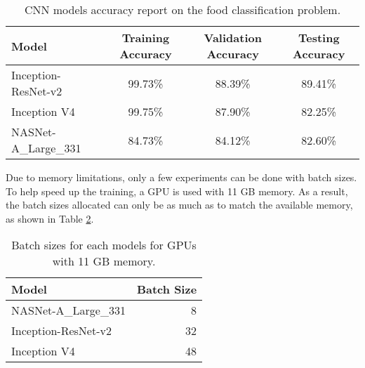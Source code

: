 \documentclass[a4paper]{article}
\begin{document}
\begin{table}
\centering
\begin{tabular}{l|c|c|c}
Model & Training Accuracy & Validation Accuracy & Testing Accuracy \\\hline
Inception-ResNet-v2 \cite{Szegedy2016} & 99.73\% &  88.39\% & 89.41\% \\
Inception V4 \cite{Szegedy2016} & 99.75\% & 87.90\% & 82.25\% \\
NASNet-A\_Large\_331 \cite{Zoph2017} & 84.73\% & 84.12\% &  82.60\% \\
\end{tabular}
\caption{\label{tab:exp_result}CNN models accuracy report on the food classification problem.}
\end{table}

Due to memory limitations, only a few experiments can be done with batch sizes. To help speed up the training, a GPU is used with 11 GB memory. As a result, the batch sizes allocated can only be as much as to match the available memory, as shown in Table \ref{tab:batch_sizes}. \\

\begin{table}
\centering
\begin{tabular}{l|r}
Model & Batch Size \\\hline
NASNet-A\_Large\_331 \cite{Zoph2017} & 8 \\
Inception-ResNet-v2 \cite{Szegedy2016} & 32 \\
Inception V4 \cite{Szegedy2016} & 48 \\
\end{tabular}
\caption{\label{tab:batch_sizes}Batch sizes for each models for GPUs with 11 GB memory.}
\end{table}
\end{document}
